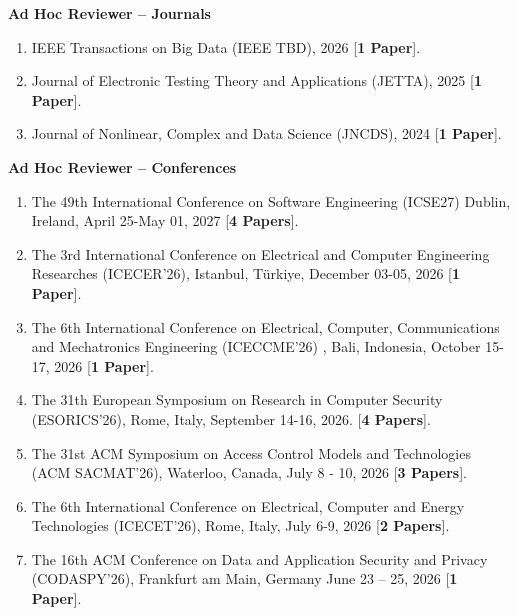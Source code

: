 \documentclass[11pt, a4paper]{article}
\begin{document}
{\fontsize{10.87}{13.5}\selectfont

\textbf{\color{cvred}Ad Hoc Reviewer -- Journals}

\smallskip
\begin{enumerate}[leftmargin=*, label=\arabic*., itemsep=4pt, topsep=2pt]

\item IEEE Transactions on Big Data (IEEE TBD), 2026 [\textbf{\color{cvred}1 Paper}].
\item  Journal of Electronic Testing Theory and Applications (JETTA), 2025 [\textbf{\color{cvred}1 Paper}].
\item Journal of Nonlinear, Complex and Data Science (JNCDS), 2024 [\textbf{\color{cvred}1 Paper}].

\end{enumerate}
\medskip
\textbf{\color{cvred}Ad Hoc Reviewer -- Conferences}

\smallskip
\begin{enumerate}[leftmargin=*, label=\arabic*., itemsep=4pt, topsep=2pt]

\item The 49th International Conference on Software Engineering (ICSE27) Dublin, Ireland, April 25-May 01, 2027 [\textbf{\color{cvred}4 Papers}].

\item The 3rd International Conference on Electrical and Computer Engineering Researches (ICECER'26), Istanbul, Türkiye, December 03-05, 2026 [\textbf{\color{cvred}1 Paper}].

\item The 6th International Conference on Electrical, Computer, Communications and Mechatronics Engineering (ICECCME'26) , Bali, Indonesia, October 15-17, 2026 [\textbf{\color{cvred}1 Paper}].

\item The 31th European Symposium on Research in Computer Security (ESORICS'26), Rome, Italy, September 14-16, 2026. [\textbf{\color{cvred}4 Papers}].

\item The 31st ACM Symposium on Access Control Models and Technologies (ACM SACMAT'26), Waterloo, Canada, July 8 - 10, 2026 [\textbf{\color{cvred}3 Papers}].

\item The 6th International Conference on Electrical, Computer and Energy Technologies (ICECET'26), Rome, Italy, July 6-9, 2026 [\textbf{\color{cvred}2 Papers}].

\item The 16th ACM Conference on Data and Application Security and Privacy (CODASPY'26), Frankfurt am Main, Germany June 23 -- 25, 2026 [\textbf{\color{cvred}1 Paper}].


\end{enumerate}}
\end{document}
